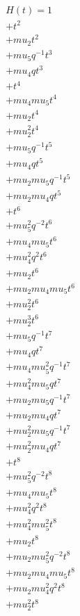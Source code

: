 \begin{align*}
H(t) = {}1 \\
  + t^{2} \\
  + mu_2 t^{2} \\
  + mu_5 q^{-1} t^{3} \\
  + mu_4 q t^{3} \\
  + t^{4} \\
  + mu_4 mu_5 t^{4} \\
  + mu_2 t^{4} \\
  + mu_2^{2} t^{4} \\
  + mu_5 q^{-1} t^{5} \\
  + mu_4 q t^{5} \\
  + mu_2 mu_5 q^{-1} t^{5} \\
  + mu_2 mu_4 q t^{5} \\
  + t^{6} \\
  + mu_5^{2} q^{-2} t^{6} \\
  + mu_4 mu_5 t^{6} \\
  + mu_4^{2} q^{2} t^{6} \\
  + mu_2 t^{6} \\
  + mu_2 mu_4 mu_5 t^{6} \\
  + mu_2^{2} t^{6} \\
  + mu_2^{3} t^{6} \\
  + mu_5 q^{-1} t^{7} \\
  + mu_4 q t^{7} \\
  + mu_4 mu_5^{2} q^{-1} t^{7} \\
  + mu_4^{2} mu_5 q t^{7} \\
  + mu_2 mu_5 q^{-1} t^{7} \\
  + mu_2 mu_4 q t^{7} \\
  + mu_2^{2} mu_5 q^{-1} t^{7} \\
  + mu_2^{2} mu_4 q t^{7} \\
  + t^{8} \\
  + mu_5^{2} q^{-2} t^{8} \\
  + mu_4 mu_5 t^{8} \\
  + mu_4^{2} q^{2} t^{8} \\
  + mu_4^{2} mu_5^{2} t^{8} \\
  + mu_2 t^{8} \\
  + mu_2 mu_5^{2} q^{-2} t^{8} \\
  + mu_2 mu_4 mu_5 t^{8} \\
  + mu_2 mu_4^{2} q^{2} t^{8} \\
  + mu_2^{2} t^{8} \\

\end{align*}
